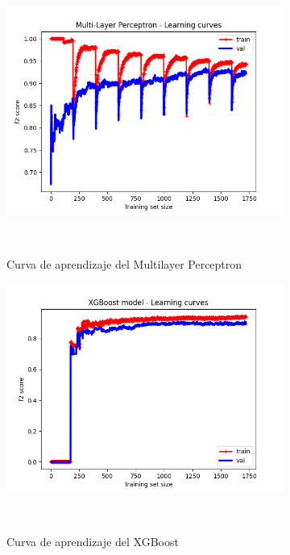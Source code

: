 \begin{figure}[!ht]
    \centering
    \begin{subfigure}[b]{0.3\textwidth}
        \includegraphics[width=\linewidth]{media/images/learning-curves/mlp.png}
        \caption{Curva de aprendizaje del Multilayer Perceptron}\ \label{sfig:lc-mlp}
    \end{subfigure}
    \begin{subfigure}[b]{0.3\textwidth}
        \includegraphics[width=\linewidth]{media/images/learning-curves/xgb.png}
        \caption{Curva de aprendizaje del XGBoost}\ \label{sfig:lc-xgb}
    \end{subfigure}
    \begin{subfigure}[b]{0.3\textwidth}

\end{subfigure}
\end{figure}
